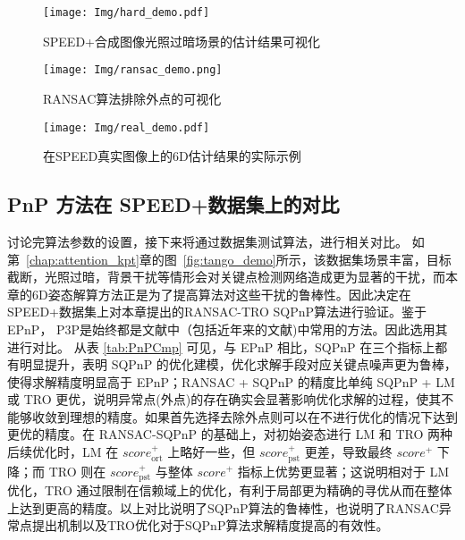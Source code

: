 \begin{figure}[!t] \centering \texttt{[image: Img/hard\_demo.pdf]} \caption{SPEED+合成图像光照过暗场景的估计结果可视化} \label{fig:hard_demo} \end{figure}

\begin{figure}[htbp] \centering \texttt{[image: Img/ransac\_demo.png]} \caption{RANSAC算法排除外点的可视化} \label{fig:ransac_demo} \end{figure}

\begin{figure}[htbp] \centering \texttt{[image: Img/real\_demo.pdf]} \caption{在SPEED真实图像上的6D估计结果的实际示例} \label{fig:real_demo} \end{figure}




\subsection{PnP 方法在 SPEED+数据集上的对比}
讨论完算法参数的设置，接下来将通过数据集测试算法，进行相关对比。
如第~\ref{chap:attention_kpt}章的图~\ref{fig:tango_demo}所示，该数据集场景丰富，目标截断，光照过暗，背景干扰等情形会对关键点检测网络造成更为显著的干扰，而本章的6D姿态解算方法正是为了提高算法对这些干扰的鲁棒性。因此决定在SPEED+数据集上对本章提出的RANSAC-TRO SQPnP算法进行验证。鉴于EPnP， P3P是始终都是文献中（包括近年来的文献)中常用的方法。因此选用其进行对比。
从表 \ref{tab:PnPCmp} 可见，与 EPnP 相比，SQPnP 在三个指标上都有明显提升，表明 SQPnP 的优化建模，优化求解手段对应关键点噪声更为鲁棒，使得求解精度明显高于 EPnP；RANSAC + SQPnP 的精度比单纯 SQPnP + LM 或 TRO 更优，说明异常点(外点)的存在确实会显著影响优化求解的过程，使其不能够收敛到理想的精度。如果首先选择去除外点则可以在不进行优化的情况下达到更优的精度。在 RANSAC-SQPnP 的基础上，对初始姿态进行 LM 和 TRO 两种后续优化时，LM 在 $score_{\text{ort}}^+$ 上略好一些，但 $score_{\text{pst}}^+$ 更差，导致最终 $score^+$ 下降；而 TRO 则在 $score_{\text{pst}}^+$ 与整体 $score^+$ 指标上优势更显著；这说明相对于 LM 优化，TRO 通过限制在信赖域上的优化，有利于局部更为精确的寻优从而在整体上达到更高的精度。以上对比说明了SQPnP算法的鲁棒性，也说明了RANSAC异常点提出机制以及TRO优化对于SQPnP算法求解精度提高的有效性。

